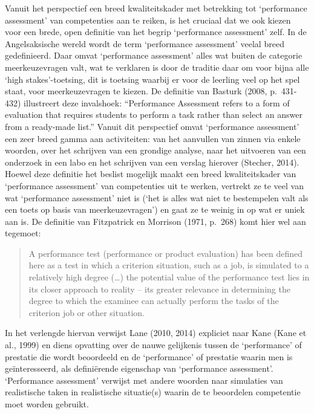 \documentclass[
  letterpaper,
]{report}
\begin{document}
Vanuit het perspectief een breed kwaliteitskader met betrekking tot
`performance assessment' van competenties aan te reiken, is het cruciaal
dat we ook kiezen voor een brede, open definitie van het begrip
`performance assessment' zelf. In de Angelsaksische wereld wordt de term
`performance assessment' veelal breed gedefinieerd. Daar omvat
`performance assessment' alles wat buiten de categorie meerkeuzevragen
valt, wat te verklaren is door de traditie daar om voor bijna alle `high
stakes'-toetsing, dit is toetsing waarbij er voor de leerling veel op
het spel staat, voor meerkeuzevragen te kiezen. De definitie van Basturk
(2008, p.~431-432) illustreert deze invalshoek: ``Performance Assessment
refers to a form of evaluation that requires students to perform a task
rather than select an answer from a ready-made list.'' Vanuit dit
perspectief omvat `performance assessment' een zeer breed gamma aan
activiteiten: van het aanvullen van zinnen via enkele woorden, over het
schrijven van een grondige analyse, naar het uitvoeren van een onderzoek
in een labo en het schrijven van een verslag hierover (Stecher, 2014).
Hoewel deze definitie het beslist mogelijk maakt een breed
kwaliteitskader van `performance assessment' van competenties uit te
werken, vertrekt ze te veel van wat `performance assessment' niet is
(`het is alles wat niet te bestempelen valt als een toets op basis van
meerkeuzevragen') en gaat ze te weinig in op wat er uniek aan is. De
definitie van Fitzpatrick en Morrison (1971, p.~268) komt hier wel aan
tegemoet:

\begin{quote}
A performance test (performance or product evaluation) has been defined
here as a test in which a criterion situation, such as a job, is
simulated to a relatively high degree (\ldots) the potential value of
the performance test lies in its closer approach to reality -- its
greater relevance in determining the degree to which the examinee can
actually perform the tasks of the criterion job or other situation.
\end{quote}

In het verlengde hiervan verwijst Lane (2010, 2014) expliciet naar Kane
(Kane et al., 1999) en diens opvatting over de nauwe gelijkenis tussen
de `performance' of prestatie die wordt beoordeeld en de `performance'
of prestatie waarin men is geïnteresseerd, als definiërende eigenschap
van `performance assessment'. `Performance assessment' verwijst met
andere woorden naar simulaties van realistische taken in realistische
situatie(s) waarin de te beoordelen competentie moet worden gebruikt.
\end{document}
